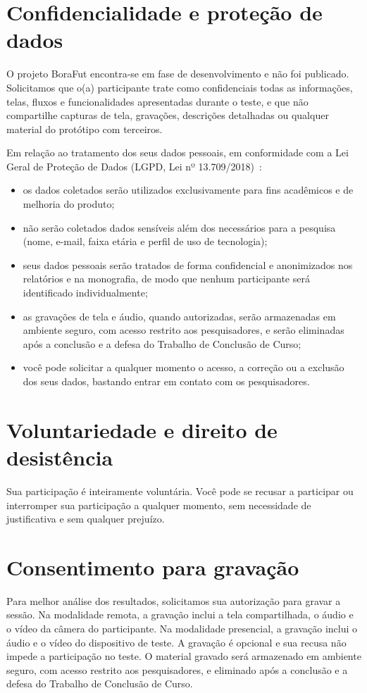 \begin{apendicesenv}
    \section*{Confidencialidade e proteção de dados}
        O projeto BoraFut encontra-se em fase de desenvolvimento e não foi publicado. Solicitamos que o(a) participante trate como confidenciais todas as informações, telas, fluxos e funcionalidades apresentadas durante o teste, e que não compartilhe capturas de tela, gravações, descrições detalhadas ou qualquer material do protótipo com terceiros.

        Em relação ao tratamento dos seus dados pessoais, em conformidade com a Lei Geral de Proteção de Dados (LGPD, Lei nº 13.709/2018)~\cite{LGPD2018}:

        \begin{itemize}
            \item os dados coletados serão utilizados exclusivamente para fins acadêmicos e de melhoria do produto;
            \item não serão coletados dados sensíveis além dos necessários para a pesquisa (nome, e-mail, faixa etária e perfil de uso de tecnologia);
            \item seus dados pessoais serão tratados de forma confidencial e anonimizados nos relatórios e na monografia, de modo que nenhum participante será identificado individualmente;
            \item as gravações de tela e áudio, quando autorizadas, serão armazenadas em ambiente seguro, com acesso restrito aos pesquisadores, e serão eliminadas após a conclusão e a defesa do Trabalho de Conclusão de Curso;
            \item você pode solicitar a qualquer momento o acesso, a correção ou a exclusão dos seus dados, bastando entrar em contato com os pesquisadores.
        \end{itemize}

    \section*{Voluntariedade e direito de desistência}
        Sua participação é inteiramente voluntária. Você pode se recusar a participar ou interromper sua participação a qualquer momento, sem necessidade de justificativa e sem qualquer prejuízo.

    \section*{Consentimento para gravação}
        Para melhor análise dos resultados, solicitamos sua autorização para gravar a sessão. Na modalidade remota, a gravação inclui a tela compartilhada, o áudio e o vídeo da câmera do participante. Na modalidade presencial, a gravação inclui o áudio e o vídeo do dispositivo de teste. A gravação é opcional e sua recusa não impede a participação no teste. O material gravado será armazenado em ambiente seguro, com acesso restrito aos pesquisadores, e eliminado após a conclusão e a defesa do Trabalho de Conclusão de Curso.


\end{apendicesenv}
